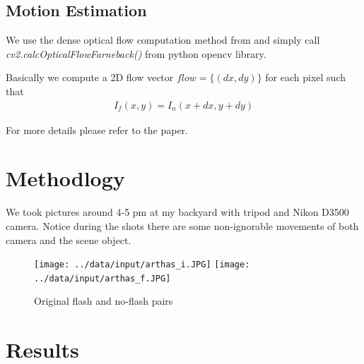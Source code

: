 \documentclass[final]{cvpr}
\begin{document}
\subsection{Motion Estimation}
We use the dense optical flow computation method from \cite{Authors2} and 
simply call \textit{cv2.calcOpticalFlowFarneback()} from python opencv library.

Basically we compute a 2D flow vector $flow = \{(dx,dy)\}$ for each pixel such 
that  
\begin{align}
   I_f(x,y) = I_n(x+dx,y+dy)
\end{align}

For more details please refer to the paper.

\section{Methodlogy}
We took pictures around 4-5 pm at my backyard with tripod and Nikon D3500 camera.
Notice during the shots there are some non-ignorable movements of both camera 
and the scene object.


\begin{figure}[ht]
   \centering
   \texttt{[image: ../data/input/arthas\_i.JPG]}
   \texttt{[image: ../data/input/arthas\_f.JPG]}
   \caption{Original flash and no-flash pairs}
\end{figure}
 
\section{Results}
\end{document}
